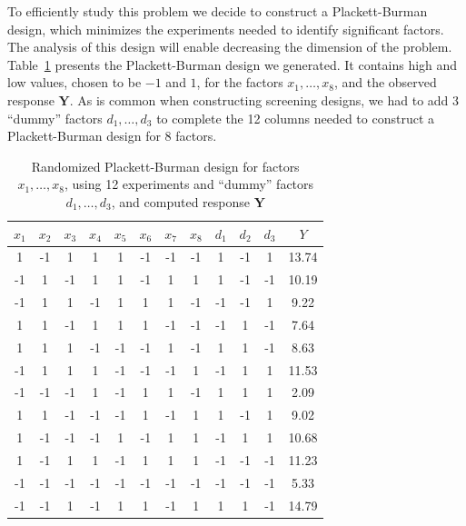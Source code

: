 \documentclass[conference]{IEEEtran}
\begin{document}
To efficiently study this problem we decide to construct a Plackett-Burman
design, which minimizes the experiments needed to identify significant factors. The
analysis of this design will enable decreasing the dimension of the problem.
Table~\ref{tab:plackett} presents the Plackett-Burman design we generated.
It contains high and low values, chosen to be \(-1\) and \(1\), for the factors
\(x_1,\dots,x_8\), and the observed response \(\mathbf{Y}\). As is common when
constructing screening designs, we had to add 3 ``dummy'' factors
\(d_1,\dots,d_3\) to complete the 12 columns needed to construct a Plackett-Burman
design for 8 factors.

\begin{table}[b]
\centering
\caption{Randomized Plackett-Burman design for factors $x_1, \dots, x_8$, using 12 experiments and ``dummy'' factors $d_1, \dots, d_3$, and computed response $\mathbf{Y}$}
\label{tab:plackett}
\begingroup\scriptsize
\begin{tabular}{cccccccccccc}
  \toprule
$x_1$ & $x_2$ & $x_3$ & $x_4$ & $x_5$ & $x_6$ & $x_7$ & $x_8$ & $d_1$ & $d_2$ & $d_3$ & $Y$ \\
  \midrule
1 & -1 & 1 & 1 & 1 & -1 & -1 & -1 & 1 & -1 & 1 & 13.74 \\
  -1 & 1 & -1 & 1 & 1 & -1 & 1 & 1 & 1 & -1 & -1 & 10.19 \\
  -1 & 1 & 1 & -1 & 1 & 1 & 1 & -1 & -1 & -1 & 1 & 9.22 \\
  1 & 1 & -1 & 1 & 1 & 1 & -1 & -1 & -1 & 1 & -1 & 7.64 \\
  1 & 1 & 1 & -1 & -1 & -1 & 1 & -1 & 1 & 1 & -1 & 8.63 \\
  -1 & 1 & 1 & 1 & -1 & -1 & -1 & 1 & -1 & 1 & 1 & 11.53 \\
  -1 & -1 & -1 & 1 & -1 & 1 & 1 & -1 & 1 & 1 & 1 & 2.09 \\
  1 & 1 & -1 & -1 & -1 & 1 & -1 & 1 & 1 & -1 & 1 & 9.02 \\
  1 & -1 & -1 & -1 & 1 & -1 & 1 & 1 & -1 & 1 & 1 & 10.68 \\
  1 & -1 & 1 & 1 & -1 & 1 & 1 & 1 & -1 & -1 & -1 & 11.23 \\
  -1 & -1 & -1 & -1 & -1 & -1 & -1 & -1 & -1 & -1 & -1 & 5.33 \\
  -1 & -1 & 1 & -1 & 1 & 1 & -1 & 1 & 1 & 1 & -1 & 14.79 \\
   \bottomrule
\end{tabular}
\endgroup
\end{table}
\end{document}
